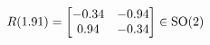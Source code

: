 \documentclass[preview]{standalone}
\begin{document}
\begin{align*}
\special{dvisvgm:raw <g id='unique000'>}R(1.91) = \begin{bmatrix} -0.34 & -0.94 \\ 0.94 & -0.34 \end{bmatrix} \in \text{SO}(2)\special{dvisvgm:raw </g>}
\end{align*}
\end{document}
